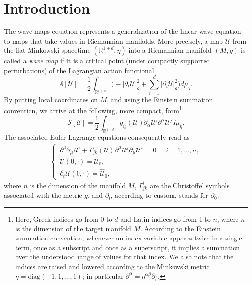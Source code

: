 \documentclass[12pt,reqno]{amsart}
\theoremstyle{plain}
\theoremstyle{remark}
\theoremstyle{plain}
\theoremstyle{definition}
\numberwithin{equation}{section}
\numberwithin{equation}{section}
\def\R{{\mathbb R}}
\begin{document}
	\section{Introduction}
	\noindent The wave maps equation represents a generalization of the linear wave equation to maps that take values in Riemannian manifolds. More precisely, a map $\mathcal{U}$ from the flat Minkowski spacetime $(\R^{1+d},\eta)$ into a Riemannian manifold $( M,g)$ is called a \emph{wave map} if it is a critical point (under compactly supported perturbations) of the Lagrangian action functional
	\begin{equation*}
		\mathcal{S}[\mathcal{U}] = \frac{1}{2} \int_{\R^{1+d}} \big(-|\partial_t\mathcal{U}|^2_{g}+ \sum_{i=1}^{d}|\partial_i \mathcal{U}|_g^2 \big)d\mu_{\eta}.
	\end{equation*}
	By putting local coordinates on $M$, and using the Einstein summation convention, we arrive at the following, more compact, form\footnote{Here, Greek indices go from 0 to $d$ and Latin indices go from 1 to $n$, where $n$ is the dimension of the target manifold $M$. According to the Einstein summation convention, whenever an index variable appears twice in a single term, once as a subscript and once as a superscript, it implies a summation over the understood range of values for that index. We also note that the indices are raised and lowered according to the Minkowski metric $\eta = \text{diag}(-1,1,\dots,1)$; in particular $\partial^\alpha = \eta^{\alpha\beta}\partial_\beta $.} 
	\begin{equation*}
		\mathcal{S}[\mathcal{U}] = \frac{1}{2} \int_{\R^{1+d}} g_{ij}(\mathcal{U})\partial_\alpha \mathcal{U}^{i} \partial^\alpha \mathcal{U}^{j}d\mu_{\eta}.
	\end{equation*}
	The associated Euler-Lagrange equations consequently read as
	\begin{align}\label{intro_eq}
		\begin{cases}
			\,\partial^{\mu}\partial_{\mu} \mathcal{U}^i+\Gamma^i_{jk}(\mathcal{U}) \partial^{\mu}\mathcal{U}^j\partial_{\mu}\mathcal{U}^k=0, \quad i=1,\dots,n,\\
			\,\mathcal{U}(0,\cdot)=\mathcal{U}_0,\\
			\,\partial_t \mathcal{U}(0,\cdot)=\hat{\mathcal{U}}_{0},
		\end{cases}
	\end{align}
	where $n$ is the dimension of the manifold $M$, $\Gamma_{jk}^i$ are the Christoffel symbols associated with the metric $g$, and $\partial_t$, according to custom, stands for $\partial_0$.
	
\end{document}
